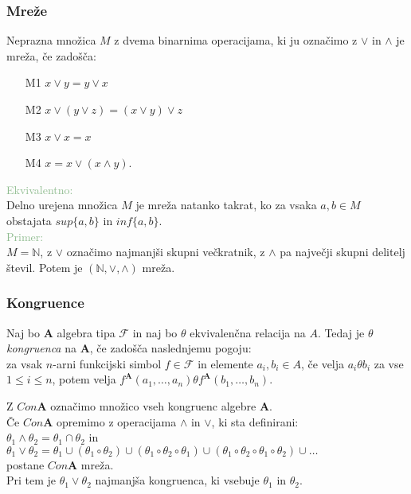 \documentclass{beamer}
\begin{document}
\begin{frame}
\frametitle{Mreže}
    
    Neprazna množica $M$ z dvema binarnima operacijama, ki ju označimo z $\vee$ in $\wedge$ je mreža, če zadošča:\\
    \begin{enumerate} 
        \item[M1] $x \vee y = y \vee x$
        \item[M2] $x\vee \left(y \vee z\right) = \left(x \vee y\right)\vee z$
        \item[M3] $x \vee x = x$
        \item[M4] $x = x \vee \left(x \wedge y\right)$. \\
    \end{enumerate}
    \pause
    \textcolor{darkseagreen}{Ekvivalentno:} \\
        Delno urejena množica $M$ je mreža natanko takrat, ko za vsaka $a, b \in M$ obstajata $sup\{a, b\}$ 
        in $inf\{a, b\}$.\\
        \textcolor{darkseagreen}{Primer:}\\
    $M = \mathbb{N}$, z $\vee$ označimo najmanjši skupni večkratnik, z $\wedge$ pa največji skupni delitelj
    števil. Potem je $\left(\mathbb{N}, \vee, \wedge\right)$ mreža. 
    
\end{frame}
\begin{frame}
\frametitle{Kongruence}
\begin{block}{}
Naj bo $\mathbf{A}$ algebra tipa $\mathcal{F}$ in naj bo $\theta$ ekvivalenčna relacija na $A$. Tedaj je $\theta$ \emph{kongruenca} 
na $\mathbf{A}$, če zadošča naslednjemu pogoju: \\
za vsak $n$-arni funkcijski simbol $f \in \mathcal{F}$ in elemente $a_i, b_i \in A$, če velja $a_i\theta b_i$ 
za vse $1 \leq i \leq n$, potem velja $f^\mathbf{A}\left(a_1, \dots, a_n\right) \theta 
f^\mathbf{A}\left(b_1, \dots, b_n\right)$.\\
\end{block}

Z $Con \mathbf{A}$ označimo množico vseh kongruenc algebre $\mathbf{A}$.
\\
\pause
Če $Con \mathbf{A}$ opremimo z operacijama $\wedge$ in $\vee$, ki sta definirani:\\
$\theta_1 \wedge \theta_2 = \theta_1 \cap \theta_2$ in \\ 
$\theta_1 \vee \theta_2 = \theta_1 \cup \left(\theta_1 \circ \theta_2\right)
\cup \left(\theta_1 \circ \theta_2 \circ \theta_1\right) \cup \left(\theta_1 \circ \theta_2 \circ \theta_1 \circ \theta_2\right) \cup \dots$ \\
postane $Con \mathbf{A}$ mreža.\\
Pri tem je $\theta_1 \vee \theta_2$ najmanjša kongruenca, ki vsebuje $\theta_1$ in $\theta_2$.
\end{frame}
\end{document}
